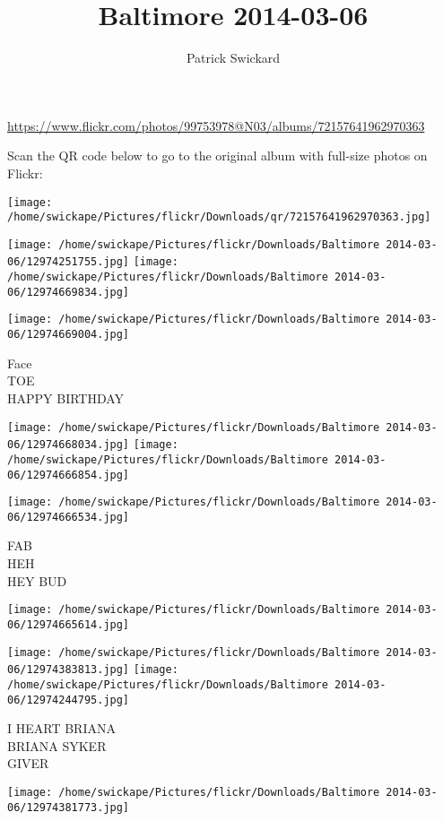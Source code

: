 \documentclass[10pt,letterpaper]{article}
\title{Baltimore 2014-03-06}
\author{Patrick Swickard}
\date{}
\begin{document}
\maketitle

\url{https://www.flickr.com/photos/99753978@N03/albums/72157641962970363}

Scan the QR code below to go to the original album with full-size photos on Flickr:

\texttt{[image: /home/swickape/Pictures/flickr/Downloads/qr/72157641962970363.jpg]}
\pagebreak

\texttt{[image: /home/swickape/Pictures/flickr/Downloads/Baltimore 2014-03-06/12974251755.jpg]}
\texttt{[image: /home/swickape/Pictures/flickr/Downloads/Baltimore 2014-03-06/12974669834.jpg]}

\vspace{0.25in}
\texttt{[image: /home/swickape/Pictures/flickr/Downloads/Baltimore 2014-03-06/12974669004.jpg]}

Face\\
TOE\\
HAPPY BIRTHDAY
\pagebreak

\texttt{[image: /home/swickape/Pictures/flickr/Downloads/Baltimore 2014-03-06/12974668034.jpg]}
\texttt{[image: /home/swickape/Pictures/flickr/Downloads/Baltimore 2014-03-06/12974666854.jpg]}

\texttt{[image: /home/swickape/Pictures/flickr/Downloads/Baltimore 2014-03-06/12974666534.jpg]}

FAB\\
HEH\\
HEY BUD
\pagebreak

\texttt{[image: /home/swickape/Pictures/flickr/Downloads/Baltimore 2014-03-06/12974665614.jpg]}

\vspace{0.25in}
\texttt{[image: /home/swickape/Pictures/flickr/Downloads/Baltimore 2014-03-06/12974383813.jpg]}
\texttt{[image: /home/swickape/Pictures/flickr/Downloads/Baltimore 2014-03-06/12974244795.jpg]}

I HEART BRIANA\\
BRIANA SYKER\\
GIVER
\pagebreak

\texttt{[image: /home/swickape/Pictures/flickr/Downloads/Baltimore 2014-03-06/12974381773.jpg]}
\end{document}
